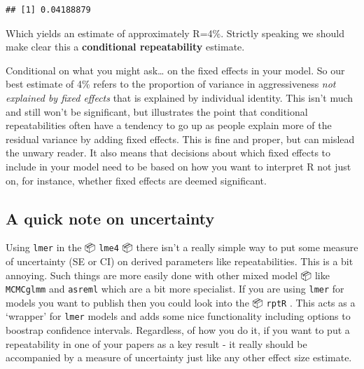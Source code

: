 \documentclass[
  12pt,
]{book}
\newenvironment{Shaded}{\begin{snugshade}}{\end{snugshade}}
\newcommand{\DecValTok}[1]{\textcolor[rgb]{0.00,0.00,0.81}{#1}}
\newcommand{\FunctionTok}[1]{\textcolor[rgb]{0.00,0.00,0.00}{#1}}
\newcommand{\NormalTok}[1]{#1}
\newcommand{\OtherTok}[1]{\textcolor[rgb]{0.56,0.35,0.01}{#1}}
\newcommand{\SpecialCharTok}[1]{\textcolor[rgb]{0.00,0.00,0.00}{#1}}
\newcommand{\StringTok}[1]{\textcolor[rgb]{0.31,0.60,0.02}{#1}}
\begin{document}
\begin{Shaded}
\end{Shaded}

\begin{verbatim}
## [1] 0.04188879
\end{verbatim}

Which yields an estimate of approximately R=4\%. Strictly speaking we should make clear this a \textbf{conditional repeatability} estimate.

Conditional on what you might ask\ldots{} on the fixed effects in your model. So our best estimate of 4\% refers to the proportion of variance in aggressiveness \emph{not explained by fixed effects} that is explained by individual identity. This isn't much and still won't be significant, but illustrates the point that conditional repeatabilities often have a tendency to go up as people explain more of the residual variance by adding fixed effects. This is fine and proper, but can mislead the unwary reader.
It also means that decisions about which fixed effects to include in your model need to be based on how you want to interpret R not just on, for instance, whether fixed effects are deemed significant.

\hypertarget{a-quick-note-on-uncertainty}{%
\subsection{A quick note on uncertainty}\label{a-quick-note-on-uncertainty}}

Using \texttt{lmer} in the 📦 \texttt{lme4} 📦 there isn't a really simple way to put some measure of uncertainty (SE or CI) on derived parameters like repeatabilities. This is a bit annoying. Such things are more easily done with other mixed model 📦 like \texttt{MCMCglmm} and \texttt{asreml} which are a bit more specialist. If you are using \texttt{lmer} for models you want to publish then you could look into the 📦 \texttt{rptR} \citep{R-rptR}. This acts as a `wrapper' for \texttt{lmer} models and adds some nice functionality including options to boostrap confidence intervals. Regardless, of how you do it, if you want to put a repeatability in one of your papers as a key result - it really should be accompanied by a measure of uncertainty just like any other effect size estimate.
\end{document}
